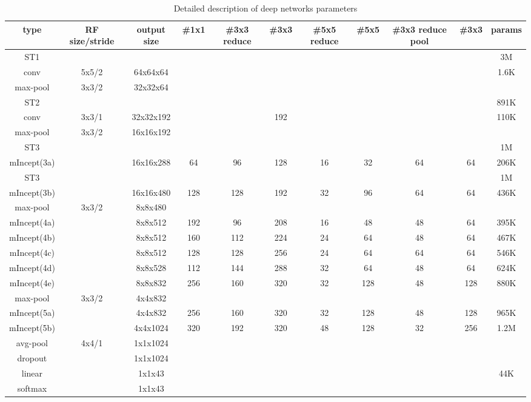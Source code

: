 \documentclass[conference]{IEEEtran}
\begin{document}
\begin{table*}[t]
\caption{Detailed description of deep networks parameters}
\label{tab:network}
  \centering
  \begin{tabular}{|c|c|c|c|c|c|c|c|c|c|c|}
\hline
 type & RF size/stride & output size & \#1x1 & \#3x3 reduce & \#3x3 & \#5x5 reduce & \#5x5 & \#3x3 reduce pool & \#3x3 & params \\
 \hline
 \hline
 ST1 & & & & & & & & & & 3M \\
 \hline
 conv & 5x5/2 &64x64x64 &  &   &   &   &   &  & & 1.6K \\
 \hline
 max-pool & 3x3/2 & 32x32x64&  &   &   &   &   & &  &  \\
 \hline
 ST2 & & & & & & & & & & 891K\\
 \hline
 conv & 3x3/1 &  32x32x192 &  &    &  192 &   &   &  & & 110K \\
 \hline
 max-pool & 3x3/2 &  16x16x192  &  &   &   &   &   &  & &  \\
 \hline
 ST3 & & & & & & & & & & 1M\\
 \hline
 mIncept(3a) &  &  16x16x288  & 64  & 96  & 128  & 16  & 32  & 64 & 64 & 206K \\
 \hline
 ST3 & & & & & & & & & & 1M\\
 \hline
 mIncept(3b) & &   16x16x480 &  128 & 128  & 192  & 32  & 96  & 64 & 64 & 436K \\
 \hline
 max-pool & 3x3/2 &  8x8x480 &  &   &   &   &   &   & & \\
 \hline
 mIncept(4a) &  &  8x8x512  & 192  & 96  & 208  & 16  & 48  & 48 & 64 & 395K \\
 \hline
 mIncept(4b) &  &    8x8x512 & 160 & 112  & 224  & 24  & 64  & 48 & 64 & 467K \\
 \hline
 mIncept(4c) &  &    8x8x512 & 128 & 128  & 256  & 24  & 64  &  64& 64& 546K \\
 \hline
 mIncept(4d) &  &    8x8x528 & 112 & 144  & 288  & 32  & 64  & 48 & 64 & 624K \\
 \hline
 mIncept(4e) &  &   8x8x832 & 256 & 160  &  320 & 32  & 128  & 48 & 128 & 880K \\
 \hline
 max-pool & 3x3/2 & 4x4x832   &  &   &   &   &   &  & &  \\
 \hline
 mIncept(5a) & &  4x4x832 & 256  & 160  & 320  & 32  & 128 & 48& 128& 965K \\
 \hline
 mIncept(5b) &  &    4x4x1024 & 320 & 192  & 320  & 48  & 128  & 32 & 256 & 1.2M \\
 \hline
 avg-pool & 4x4/1 &  1x1x1024  &  &   &   &   &   &  & &  \\
 \hline
 dropout &  &  1x1x1024   &  &   &   &   &   &  & &  \\
 \hline
 linear &  &  1x1x43  &  &   &   &   &   &  &  & 44K \\
 \hline
 softmax &  &  1x1x43  &  &   &   &   &   &  &  &  \\

\hline
 \end{tabular}
\end{table*}
\end{document}
